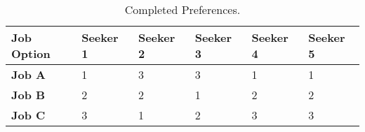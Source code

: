\begin{table}[h!]
\begin{center}
\caption{Completed Preferences.}
\label{toy_complete}
\begin{tabular}{l|l|l|l|l|l}
\hline 
\textbf{Job Option} & \textbf{Seeker 1} &  \textbf{Seeker 2} & \textbf{Seeker 3} &\textbf{Seeker 4} &\textbf{Seeker 5} \\
\hline
\textbf{Job A} & 1 & 3 & 3 & 1 & 1\\
\textbf{Job B} & 2 & 2 & 1 & 2 & 2\\
\textbf{Job C} & 3 & 1 & 2 & 3 & 3\\
\hline 
\end{tabular}
\end{center}
\end{table}

